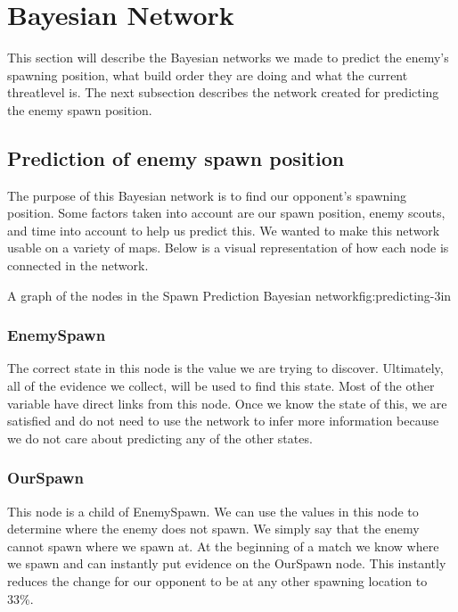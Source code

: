 \section{Bayesian Network}\label{bayesian_network}
This section will describe the Bayesian networks we made to predict the enemy's spawning position, what build order they are doing and what the current 
threatlevel is. The next subsection describes the network created for predicting the enemy spawn position.




\subsection{Prediction of enemy spawn position}			 
			
The purpose of this Bayesian network is to find our opponent's spawning position. Some factors taken into account are our spawn position, enemy scouts, and time into account to help us predict this. We wanted to make this network usable on a variety of maps. Below is a visual representation of how each node is connected in the network.

			{A graph of the nodes in the Spawn Prediction Bayesian network}{fig:predicting}{-3in}


\subsubsection*{EnemySpawn}
The correct state in this node is the value we are trying to discover. Ultimately, all of the evidence we collect, will be used to find this state. Most of the other variable have direct links from this node. Once we know the state of this, we are satisfied and do not need to use the network to infer more information because we do not care about predicting any of the other states.

\subsubsection*{OurSpawn}
This node is a child of EnemySpawn. We can use the values in this node to determine where the enemy does not spawn. We simply say that the enemy cannot spawn where we spawn at. At the beginning of a match we know where we spawn and can instantly put evidence on the OurSpawn node. This instantly reduces the change for our opponent to be at any other spawning location to 33\%.

